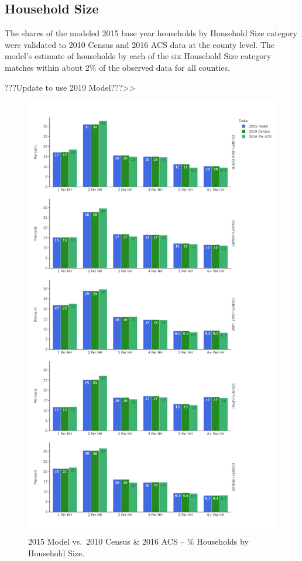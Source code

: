 \documentclass[
  letterpaper,
  DIV=11,
  numbers=noendperiod]{scrreprt}
\begin{document}
\hypertarget{household-size}{%
\subsection{Household Size}\label{household-size}}

The shares of the modeled 2015 base year households by Household Size
category were validated to 2010 Census and 2016 ACS data at the county
level. The model's estimate of households by each of the six Household
Size category matches within about 2\% of the observed data for all
counties.

???Update to use 2019 Model???\textgreater\textgreater{}

\begin{figure}[H]

{\centering \includegraphics[width=\textwidth,height=0.9\textheight]{v9x/v900/validation/_pictures/2-plot7.png}

}

\caption{\label{fig-pdf-hh-modobs}2015 Model vs.~2010 Census \& 2016 ACS
-- \% Households by Household Size.}

\end{figure}
\end{document}
